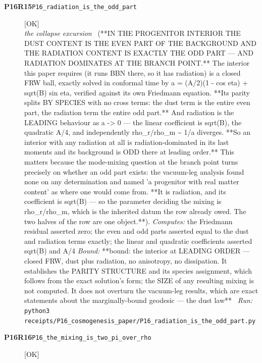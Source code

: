 \begin{description}
\item[\textbf{P16R15}\quad\texttt{P16\_radiation\_is\_the\_odd\_part}]\hfill\textsf{[OK]}\\
\textit{the collapse excursion} \ (**IN THE PROGENITOR INTERIOR THE DUST CONTENT IS THE EVEN PART OF THE BACKGROUND AND THE RADIATION CONTENT IS EXACTLY THE ODD PART --- AND RADIATION DOMINATES AT THE BRANCH POINT.** The interior this paper requires (it runs BBN there, so it has radiation) is a closed FRW ball, exactly solved in conformal time by a = (A/2)(1 - cos eta) + sqrt(B) sin eta, verified against its own Friedmann equation. **Its parity splits BY SPECIES with no cross terms: the dust term is the entire even part, the radiation term the entire odd part.** And radiation is the LEADING behaviour as a -> 0 --- the linear coefficient is sqrt(B), the quadratic A/4, and independently rho\_r/rho\_m \textasciitilde{} 1/a diverges. **So an interior with any radiation at all is radiation-dominated in its last moments and its background is ODD there at leading order.** This matters because the mode-mixing question at the branch point turns precisely on whether an odd part exists: the vacuum-leg analysis found none on any determination and named 'a progenitor with real matter content' as where one would come from. **It is radiation, and its coefficient is sqrt(B) --- so the parameter deciding the mixing is rho\_r/rho\_m, which is the inherited datum the row already owed. The two halves of the row are one object.**). 
\emph{Computes:} the Friedmann residual asserted zero; the even and odd parts asserted equal to the dust and radiation terms exactly; the linear and quadratic coefficients asserted sqrt(B) and A/4
 \emph{Bound:} **bound: the interior at LEADING ORDER --- closed FRW, dust plus radiation, no anisotropy, no dissipation. It establishes the PARITY STRUCTURE and its species assignment, which follows from the exact solution's form; the SIZE of any resulting mixing is not computed. It does not overturn the vacuum-leg results, which are exact statements about the marginally-bound geodesic --- the dust law**
\ \emph{Run:} \texttt{python3 receipts/P16\_cosmogenesis\_paper/P16\_radiation\_is\_the\_odd\_part.py}
\item[\textbf{P16R16}\quad\texttt{P16\_the\_mixing\_is\_two\_pi\_over\_rho}]\hfill\textsf{[OK]}\\

\end{description}
